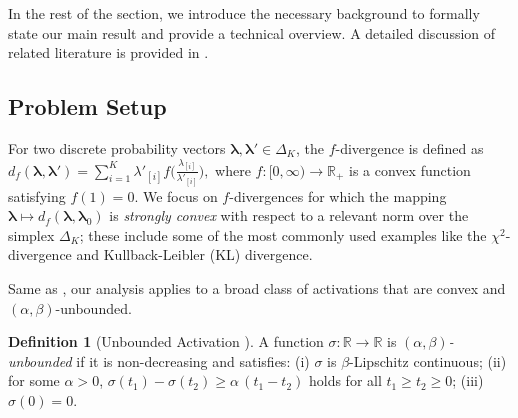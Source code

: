 \documentclass[11pt]{article}
\newcounter{thm}
\numberwithin{thm}{section}
\theoremstyle{plain}
\theoremstyle{definition}
\newtheorem{definition}[thm]{Definition}
\theoremstyle{remark} \newtheorem{remark}[thm]{Remark}
\def\vlambda{{\bm{\lambda}}}
\newcommand{\R}{\mathbb{R}}
\begin{document}
In the rest of the section, we introduce the necessary background to formally state our main result and provide a technical overview. 
A detailed discussion of related literature is provided in . 

\subsection{Problem Setup}\label{subsec:problem_setup}

For two discrete probability vectors \(\vlambda, \vlambda' \in \Delta_K\), the \(f\)-divergence is defined as 
\(
d_f(\vlambda, \vlambda') = \sum_{i=1}^K \lambda'_{[i]} f\big(\frac{\lambda_{[i]}}{\lambda'_{[i]}}\big), 
\) 
where \(f:[0,\infty)\to\R_+\) is a convex function satisfying \(f(1)=0\). We focus on \(f\)-divergences for which the mapping \(\vlambda \mapsto d_f(\vlambda, \vlambda_0)\) is \emph{strongly convex} with respect to a relevant norm over the simplex \(\Delta_K\); these include some of the most commonly used examples like the \(\chi^2\)-divergence and Kullback-Leibler (KL) divergence.

Same as \citep{Li2024shifts}, our analysis applies to a broad class of activations that are convex and $(\alpha, \beta)$-unbounded. 
\begin{definition}[Unbounded Activation \citep{DKTZ22}]\label{def:activation}
A function \(\sigma:\R\to\R\) is \emph{\((\alpha,\beta)\)-unbounded} if it is non-decreasing and satisfies: (i) \(\sigma\) is \(\beta\)-Lipschitz continuous; (ii) for some \(\alpha > 0\), \(\sigma(t_1)-\sigma(t_2)\ge \alpha\,(t_1-t_2)\) holds for all \(t_1\ge t_2\ge0\); (iii) \(\sigma(0)=0\).
\end{definition}
\end{document}
